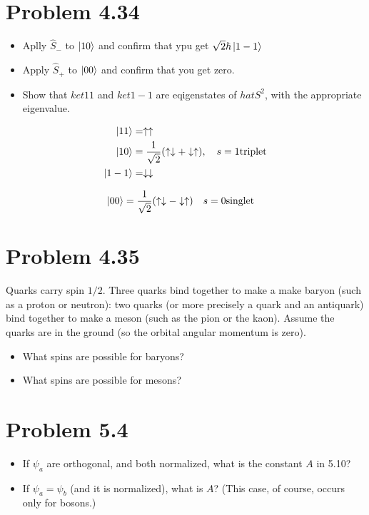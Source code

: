 \documentclass[../main.tex]{subfiles}
\begin{document}
\section{Problem 4.34}

\begin{itemize}
    \item Aplly $\hat{S}_{-}$ to $\ket{10}$ and confirm that ypu get $\sqrt{2}\hbar\ket{1-1}$
    \item Apply $\hat{S}_{+}$ to $\ket{00}$ and confirm that you get zero.
    \item Show that $ket{11}$ and $ket{1-1}$ are eqigenstates of $hat{S}^2$, with the appropriate eigenvalue.
\end{itemize}

\begin{align*}
    \ket{11} &= \uparrow\uparrow \\
    \ket{10} &= \frac{1}{\sqrt{2}}\qty(\uparrow\downarrow+\downarrow\uparrow),\quad s=1\mathrm{triplet} \\
    \ket{1-1} &= \downarrow\downarrow \\
\end{align*}

\begin{align*}
    \ket{00} &= \frac{1}{\sqrt{2}}\qty(\uparrow\downarrow-\downarrow\uparrow) \quad s=0\mathrm{singlet}
\end{align*}


\section{Problem 4.35}

Quarks carry spin $1/2$.
Three quarks bind together to make a make baryon (such as a proton or neutron): two quarks (or more precisely a quark and an antiquark) bind together to make a meson (such as the pion or the kaon).
Assume the quarks are in the ground (so the orbital angular momentum is zero).

\begin{itemize}
    \item What spins are possible for baryons?
    \item What spins are possible for mesons?
\end{itemize}

\section{Problem 5.4}

\begin{itemize}
    \item If $\psi_a$ are orthogonal, and both normalized, what is the constant $A$ in 5.10?
    \item If $\psi_a=\psi_b$ (and it is normalized), what is $A$? (This case, of course, occurs only for bosons.)
\end{itemize}
\end{document}
